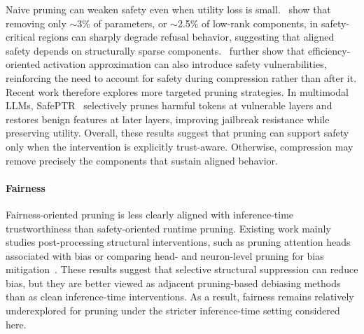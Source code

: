 Naive pruning can weaken safety even when utility loss is small.~\citet{wei2024assessing} show that removing only $\sim$3\% of parameters, or $\sim$2.5\% of low-rank components, in safety-critical regions can sharply degrade refusal behavior, suggesting that aligned safety depends on structurally sparse components.~\citet{zhang2025activation} further show that efficiency-oriented activation approximation can also introduce safety vulnerabilities, reinforcing the need to account for safety during compression rather than after it. Recent work therefore explores more targeted pruning strategies. In multimodal LLMs, SafePTR~\citep{chen2025safeptr} selectively prunes harmful tokens at vulnerable layers and restores benign features at later layers, improving jailbreak resistance while preserving utility. Overall, these results suggest that pruning can support safety only when the intervention is explicitly trust-aware. Otherwise, compression may remove precisely the components that sustain aligned behavior.


\paragraph{Fairness}
\label{sec:pruning-fairness}

Fairness-oriented pruning is less clearly aligned with inference-time trustworthiness than safety-oriented runtime pruning. Existing work mainly studies post-processing structural interventions, such as pruning attention heads associated with bias or comparing head- and neuron-level pruning for bias mitigation~\citep{zayed2024fairness, ma2025breaking}. These results suggest that selective structural suppression can reduce bias, but they are better viewed as adjacent pruning-based debiasing methods than as clean inference-time interventions. As a result, fairness remains relatively underexplored for pruning under the stricter inference-time setting considered here.


